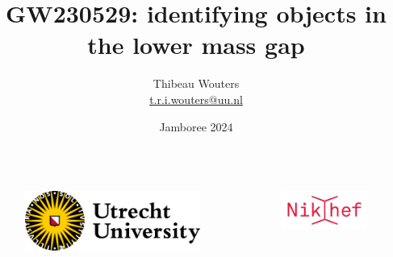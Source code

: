 \documentclass[usenames,dvipsnames,t]{beamer}
\title[GW230529] %
{GW230529: identifying objects in the lower mass gap}
\author[Thibeau Wouters]{Thibeau Wouters \\ \vspace{4mm} \href{mailto:t.r.i.wouters@uu.nl}{t.r.i.wouters@uu.nl} \\ \vspace{4mm} \github \quad \linkedin \quad \twitter}
\date{Jamboree 2024}
\begin{document}
{


\begin{frame}[plain]
\titlepage

\begin{columns}
  \begin{figure}
    \centering
    \vspace{1.5mm}
    \includegraphics[width=0.75\linewidth]{Figures/utrecht-university.png}
  \end{figure}
  \begin{figure}
    \centering
    \includegraphics[width=0.75\linewidth]{Figures/Nikhef_logo-transparent.png}
  \end{figure}
\end{columns}

\end{frame}
}
\end{document}
